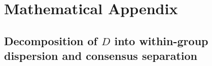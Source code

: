 \documentclass[12pt]{article}
\begin{document}













\printbibliography

\appendix

\section{Mathematical Appendix}
\subsection{Decomposition of \(D\) into within-group dispersion and consensus separation}
\label{app:d-consensus-separation}
\end{document}
